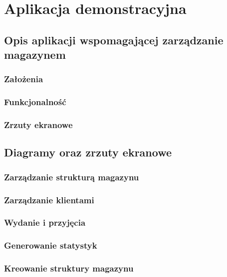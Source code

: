 \chapter{Aplikacja demonstracyjna}
\label{c4:c4}

\section{Opis aplikacji wspomagającej zarządzanie magazynem}
	\subsection{Założenia}
	\subsection{Funkcjonalność}
	\subsection{Zrzuty ekranowe}

\section{Diagramy oraz zrzuty ekranowe}
	\subsection{Zarządzanie strukturą magazynu}
	\subsection{Zarządzanie klientami}
	\subsection{Wydanie i przyjęcia}
	\subsection{Generowanie statystyk}
	\subsection{Kreowanie struktury magazynu}